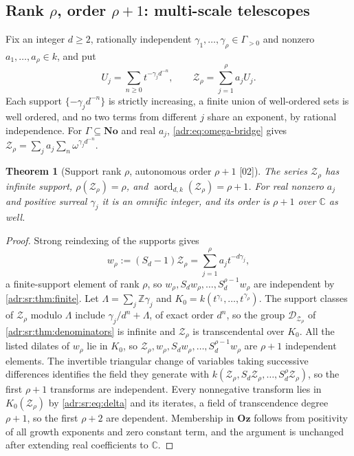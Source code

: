 \documentclass[11pt,letterpaper]{article}
\numberwithin{equation}{section}
\newtheorem{theorem}{Theorem}[section]
\theoremstyle{definition}
\theoremstyle{remark}
\newcommand{\No}{\mathbf{No}}
\newcommand{\Oz}{\mathbf{Oz}}
\newcommand{\C}{\mathbb C}
\newcommand{\Z}{\mathbb Z}
\newcommand{\src}[1]{\textup{[#1]}}%
\begin{document}
\subsection{Rank \texorpdfstring{$\rho$}{rho}, order \texorpdfstring{$\rho+1$}{rho+1}: multi-scale telescopes}

Fix an integer $d\ge2$, rationally independent $\gamma_1,\ldots,\gamma_\rho\in\Gamma_{>0}$
and nonzero $a_1,\ldots,a_\rho\in k$, and put
\begin{equation}\label{adr:sr:eq:telescopes}
 U_j=\sum_{n\ge0}t^{-\gamma_jd^{-n}},\qquad \mathcal Z_\rho=\sum_{j=1}^\rho a_jU_j.
\end{equation}
Each support $\{-\gamma_jd^{-n}\}$ is strictly increasing, a finite union of
well-ordered sets is well ordered, and no two terms from different $j$ share
an exponent, by rational independence. For $\Gamma\subseteq\No$ and real
$a_j$, \eqref{adr:eq:omega-bridge} gives
$\mathcal Z_\rho=\sum_ja_j\sum_n\omega^{\gamma_jd^{-n}}$.

\begin{theorem}[Support rank $\rho$, autonomous order $\rho+1$ \src{02}]
\label{adr:sr:thm:telescopes}
The series $\mathcal Z_\rho$ has infinite support, $\rho(\mathcal Z_\rho)=\rho$,
and $\operatorname{aord}_{d,k}(\mathcal Z_\rho)=\rho+1$. For real nonzero $a_j$
and positive surreal $\gamma_j$ it is an omnific integer, and its order is
$\rho+1$ over $\C$ as well.
\end{theorem}
\begin{proof}
Strong reindexing of the supports gives
\begin{equation}\label{adr:sr:eq:delta}
 w_\rho:=(S_d-1)\mathcal Z_\rho=\sum_{j=1}^\rho a_jt^{-d\gamma_j},
\end{equation}
a finite-support element of rank $\rho$, so
$w_\rho,S_dw_\rho,\ldots,S_d^{\rho-1}w_\rho$ are independent by
\cref{adr:sr:thm:finite}. Let $\Lambda=\sum_j\Z\gamma_j$ and
$K_0=k(t^{\gamma_1},\ldots,t^{\gamma_\rho})$. The support classes of
$\mathcal Z_\rho$ modulo $\Lambda$ include $\gamma_j/d^n+\Lambda$, of exact
order $d^n$, so the group $\mathcal D_{\mathcal Z_\rho}$ of
\cref{adr:sr:thm:denominators} is infinite and $\mathcal Z_\rho$ is
transcendental over $K_0$. All the listed dilates of $w_\rho$ lie in $K_0$, so
$\mathcal Z_\rho,w_\rho,S_dw_\rho,\ldots,S_d^{\rho-1}w_\rho$ are $\rho+1$
independent elements. The invertible triangular change of variables taking
successive differences identifies the field they generate with
$k(\mathcal Z_\rho,S_d\mathcal Z_\rho,\ldots,S_d^\rho\mathcal Z_\rho)$, so the
first $\rho+1$ transforms are independent. Every nonnegative transform lies in
$K_0(\mathcal Z_\rho)$ by \eqref{adr:sr:eq:delta} and its iterates, a field of
transcendence degree $\rho+1$, so the first $\rho+2$ are dependent.
Membership in $\Oz$ follows from positivity of all growth exponents and zero
constant term, and the argument is unchanged after extending real
coefficients to $\C$.
\end{proof}
\end{document}
